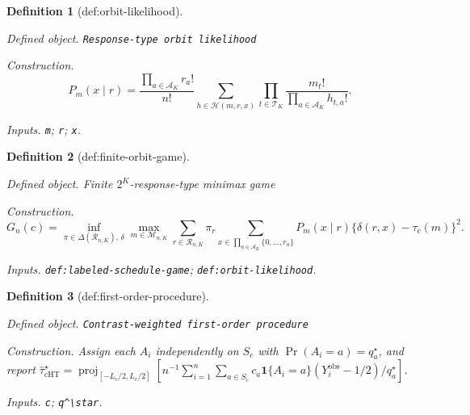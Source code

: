 \documentclass{article}
\newtheorem{definition}{Definition}
\begin{document}
\begin{definition}[def:orbit-likelihood]\label{def:orbit-likelihood}
\par\smallskip\noindent\emph{Defined object.} \texttt{Response-\allowbreak{}type orbit likelihood}
\par\smallskip\noindent\emph{Construction.} \[P_m(x\mid r)=\frac{\prod_{a\in\mathcal A_K}r_a!}{n!}\sum_{h\in\mathcal H(m,r,x)}\prod_{t\in\mathcal T_K}\frac{m_t!}{\prod_{a\in\mathcal A_K}h_{t,a}!}.\]
\par\smallskip\noindent\emph{Inputs.} \texttt{m}; \texttt{r}; \texttt{x}.
\end{definition}

\begin{definition}[def:finite-orbit-game]\label{def:finite-orbit-game}
\par\smallskip\noindent\emph{Defined object.} Finite \(2^K\)-response-type minimax game
\par\smallskip\noindent\emph{Construction.} \[G_n(c)=\inf_{\pi\in\Delta(\mathcal R_{n,K}),\,\delta}\max_{m\in\mathcal M_{n,K}}\sum_{r\in\mathcal R_{n,K}}\pi_r\sum_{x\in\prod_{a\in\mathcal A_K}\{0,\ldots,r_a\}}P_m(x\mid r)\{\delta(r,x)-\tau_c(m)\}^2.\]
\par\smallskip\noindent\emph{Inputs.} \texttt{def:\allowbreak{}labeled-\allowbreak{}schedule-\allowbreak{}game}; \texttt{def:\allowbreak{}orbit-\allowbreak{}likelihood}.
\end{definition}

\begin{definition}[def:first-order-procedure]\label{def:first-order-procedure}
\par\smallskip\noindent\emph{Defined object.} \texttt{Contrast-\allowbreak{}weighted first-\allowbreak{}order procedure}
\par\smallskip\noindent\emph{Construction.} Assign each \(A_i\) independently on \(S_c\) with \(\Pr(A_i=a)=q_a^\star\), and report \(\widehat\tau_{\mathrm{cHT}}^\star=\operatorname{proj}_{[-L_c/2,L_c/2]}\!\left[n^{-1}\sum_{i=1}^n\sum_{a\in S_c}c_a\mathbf 1\{A_i=a\}(Y_i^{\mathrm{obs}}-1/2)/q_a^\star\right]\).
\par\smallskip\noindent\emph{Inputs.} \texttt{c}; \texttt{q\textasciicircum{}\textbackslash{}\allowbreak{}star}.
\end{definition}
\end{document}
